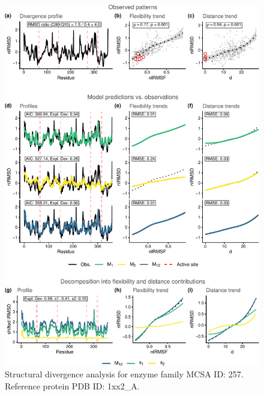 \documentclass[
]{article}
\begin{document}
\clearpage
\begin{figure}[H]
\centering


\begin{center}\includegraphics{supplementary_material_files/figure-latex/generate_figures-13} \end{center}

\caption{Structural divergence analysis for enzyme family MCSA ID: 257. Reference protein PDB ID: 1xx2\_A.}
\end{figure}
\end{document}
